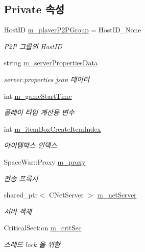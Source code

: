 \subsection*{Private 속성}
\begin{DoxyCompactItemize}
\item 
Host\+ID \hyperlink{class_server_a8f7f03253584e9db740a5f9f97ff1fc5}{m\+\_\+player\+P2\+P\+Group} = Host\+I\+D\+\_\+\+None
\begin{DoxyCompactList}\small\item\em P2P 그룹의 Host\+ID \end{DoxyCompactList}\item 
string \hyperlink{class_server_ae4a69c37027fd029b43099469ae00ad8}{m\+\_\+server\+Properties\+Data}
\begin{DoxyCompactList}\small\item\em server.\+properties json 데이터 \end{DoxyCompactList}\item 
int \hyperlink{class_server_a8506d244bc66607aaae1e0374f57bf99}{m\+\_\+game\+Start\+Time}
\begin{DoxyCompactList}\small\item\em 플레이 타임 계산용 변수 \end{DoxyCompactList}\item 
int \hyperlink{class_server_a172443f3be6f379fea950b0418799812}{m\+\_\+item\+Box\+Create\+Item\+Index}
\begin{DoxyCompactList}\small\item\em 아이템박스 인덱스 \end{DoxyCompactList}\item 
Space\+War\+::\+Proxy \hyperlink{class_server_adbe7ca5dd78f70ef2771eb1724b397de}{m\+\_\+proxy}
\begin{DoxyCompactList}\small\item\em 전송 프록시 \end{DoxyCompactList}\item 
shared\+\_\+ptr$<$ C\+Net\+Server $>$ \hyperlink{class_server_acc5f0ab874532daace973f25df16888e}{m\+\_\+net\+Server}
\begin{DoxyCompactList}\small\item\em 서버 객체 \end{DoxyCompactList}\item 
Critical\+Section \hyperlink{class_server_a44d7a150eabe67176df40466848d2021}{m\+\_\+crit\+Sec}
\begin{DoxyCompactList}\small\item\em 스레드 lock 을 위함 \end{DoxyCompactList}\item 

\end{DoxyCompactItemize}
